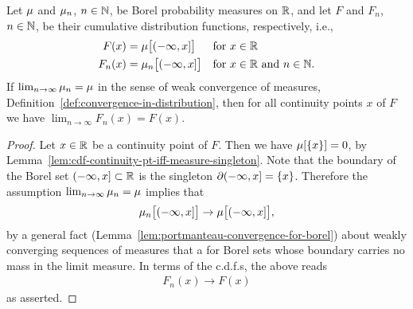 \begin{lemma}
  \label{lem:cdf-convergence-from-convergence-in-distribution}
  Let $\mu$ and $\mu_n$, $n \in \mathbb{N}$, be Borel
  probability measures on $\mathbb{R}$, and let $F$ and $F_n$, $n \in \mathbb{N}$,
  be their cumulative distribution functions, respectively, i.e.,
  \begin{align*}
      F(x) = \; & \mu \big[(-\infty,x]\big] & & \text{for $x \in \mathbb{R}$} \\
      F_n(x) = \; & \mu_n \big[(-\infty,x]\big] & & \text{for $x \in \mathbb{R}$ and $n \in \mathbb{N}$.}
  \end{align*}
  If $\lim_{n \to \infty} \mu_n = \mu$ in the sense of weak convergence
  of measures, Definition~\ref{def:convergence-in-distribution}, then
  for all continuity points $x$ of $F$ we have
  $\lim_{n \to \infty} F_n(x) = F(x)$.
\end{lemma}
\begin{proof}
  Let $x \in \mathbb{R}$ be a continuity point of $F$. Then we have $\mu [\left\{ x \right\}] = 0$,
  by Lemma~\ref{lem:cdf-continuity-pt-iff-measure-singleton}.
  Note that the boundary of the Borel set $(-\infty,x] \subset \mathbb{R}$ is
  the singleton $\partial (-\infty,x] = \left\{ x \right\}$.
  Therefore the assumption $\lim_{n \to \infty} \mu_n = \mu$ implies that
  \begin{align*}
    \mu_n \big[ (-\infty,x] \big] \to \mu \big[ (-\infty,x] \big] ,
  \end{align*}
  by a general fact (Lemma~\ref{lem:portmanteau-convergence-for-borel})
  about weakly converging sequences of measures
  that a for Borel sets whose boundary carries no mass in the limit measure.
  In terms of the c.d.f.s, the above reads
  \begin{align*}
    F_n(x) \to F(x)
  \end{align*}
  as asserted.
\end{proof}
